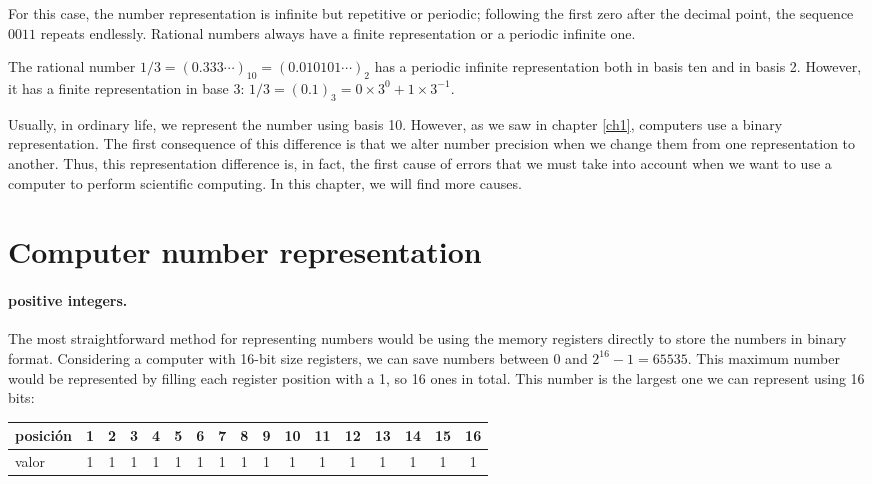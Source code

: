 \begin{paracol}{2}
\switchcolumn
For this case, the number representation is infinite but repetitive or periodic; following the first zero after the decimal point, the sequence $0011$ repeats endlessly.
Rational numbers always have a finite representation or a periodic infinite one.

The rational number $1/3=(0.333\cdots)_{10} = (0.010101\cdots)_2$ has a periodic infinite representation both in basis ten and in basis 2. However, it has a finite representation in base 3: $1/3=(0.1)_{3}= 0 \times 3^0 + 1\times 3^{-1}$.

Usually, in ordinary life, we represent the number using basis 10. However, as we saw in chapter \ref{ch1}, computers use a binary representation. The first consequence of this difference is that we alter number precision when we change them from one representation to another. Thus, this representation difference is, in fact, the first cause of errors that we must take into account when we want to use a computer to perform scientific computing. In this chapter, we will find more causes.

\section{Computer number representation}
\paragraph{positive integers.} The most straightforward method for representing numbers would be using the memory registers directly to store the numbers in binary format. Considering a computer with 16-bit size registers, we can save numbers between 0 and $2^{16}-1=65535$. This maximum number would be represented by filling each register position with a 1, so 16 ones in total. This number is the largest one we can represent using 16 bits:
\end{paracol}

\begin{tabular}{|l|c|c|c|c|c|c|c|c|c|c|c|c|c|c|c|c|}
\hline
posición&1&2&3&4&5&6&7&8&9&10&11&12&13&14&15&16  \\
\hline
valor&1&1&1&1&1&1&1&1&1&1&1&1&1&1&1&1 \\
\hline
\end{tabular}\\

